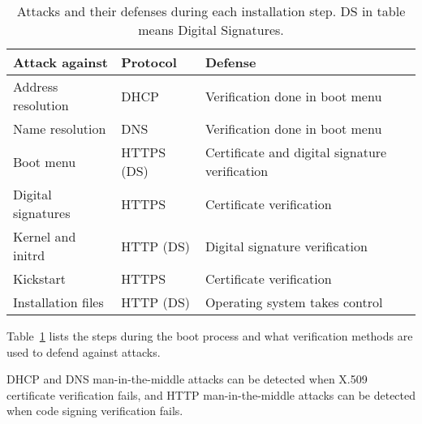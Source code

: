 \begin{table}[!ht]
  \def\arraystretch{1.1}%
  \begin{center}
    \caption{Attacks and their defenses during each installation
      step. DS in table means Digital
      Signatures.\label{tab:attack_and_defence}}
    \begin{tabular}{| l | l | l |}
      \hline
      Attack against     & Protocol   & Defense                                        \\
      \hline
      Address resolution & DHCP       & Verification done in boot menu              \\
      Name resolution    & DNS        & Verification done in boot menu              \\
      Boot menu          & HTTPS (DS) & Certificate and digital signature verification \\
      Digital signatures & HTTPS      & Certificate verification                     \\
      Kernel and initrd  & HTTP (DS)  & Digital signature verification               \\
      Kickstart          & HTTPS      & Certificate verification                     \\
      Installation files & HTTP (DS)  & Operating system takes control               \\
      \hline
    \end{tabular}
  \end{center}
\end{table}

Table~\ref{tab:attack_and_defence} lists the steps during the boot
process and what verification methods are used to defend against
attacks.

DHCP and DNS man-in-the-middle attacks can be detected when X.509
certificate verification fails, and HTTP man-in-the-middle attacks can
be detected when code signing verification fails.


